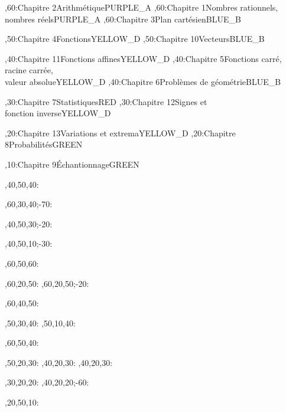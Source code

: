 \documentclass[tikz]{standalone}
\begin{document}
%
	\begin{chart}
	,60:{Chapitre 2}{Arithmétique}{}{PURPLE_A}
	,60:{Chapitre 1}{Nombres rationnels, \\ nombres réels}{}{PURPLE_A}
	,60:{Chapitre 3}{Plan cartésien}{}{BLUE_B}
	
	,50:{Chapitre 4}{Fonctions}{}{YELLOW_D}
	,50:{Chapitre 10}{Vecteurs}{}{BLUE_B}
	
	,40:{Chapitre 11}{Fonctions affines}{}{YELLOW_D}
	,40:{Chapitre 5}{Fonctions carré, \\ racine carrée, \\ valeur absolue}{}{YELLOW_D}
	,40:{Chapitre 6}{Problèmes de géométrie}{}{BLUE_B}
	
	,30:{Chapitre 7}{Statistiques}{}{RED}
	,30:{Chapitre 12}{Signes et \\ fonction inverse}{}{YELLOW_D}
	
	,20:{Chapitre 13}{Variations et extrema}{}{YELLOW_D}
	,20:{Chapitre 8}{Probabilités}{}{GREEN}
	
	,10:{Chapitre 9}{Échantionnage}{}{GREEN}
	
	
	
	
	,40,50,40:
	
	,60,30,40;-70:
	
	,40,50,30;-20:
	
	
	,40,50,10;-30:

	,60,50,60:
	
	,60,20,50:
	,60,20,50;-20:
	
	,60,40,50:
	
	,50,30,40:
	,50,10,40:
	
	,60,50,40:
	
	,50,20,30:
	,40,20,30:
	,40,20,30:
	
	,30,20,20:
	,40,20,20;-60:
	
	,20,50,10:
	
	\end{chart}
%
\end{document}
